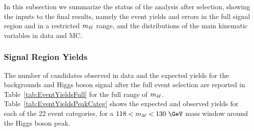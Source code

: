 

In this subsection we summarize the status of the analysis after selection, showing the inputs to the final results, namely the event yields and errors in the full signal region and in a restricted  $m_{4\ell}$ range, and the distributions of the main kinematic variables in data and MC. 

\subsubsection{Signal Region Yields}

The number of candidates observed in data and the expected yields for the backgrounds and Higgs boson signal after the full event selection are reported in Table~\ref{tab:EventYieldsFull} for the full range of $m_{4\ell}$. %
Table~\ref{tab:EventYieldsPeakCateg} shows the expected and observed yields for each of the 22 event categories, for a $118<\mllll<130~\GeV$ mass window around the Higgs boson peak.

